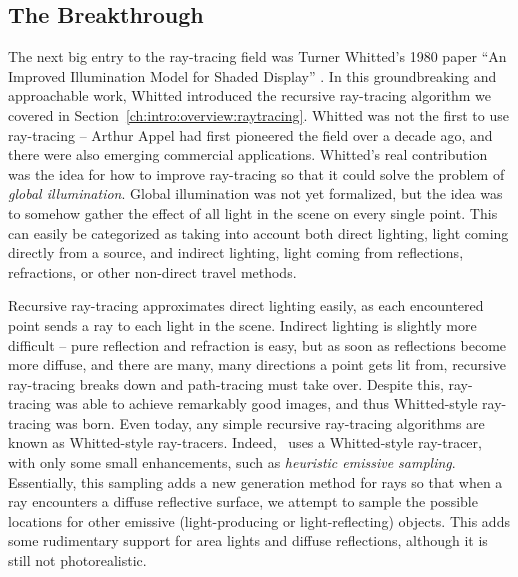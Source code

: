 \subsection{The Breakthrough}
\label{ch:relatedwork:discovery:breakthrough}

The next big entry to the ray-tracing field was Turner Whitted's 1980 paper ``An Improved Illumination Model for Shaded Display'' \cite{whitted1980improved}.
In this groundbreaking and approachable work, Whitted introduced the recursive ray-tracing algorithm we covered in Section~\ref{ch:intro:overview:raytracing}.
Whitted was not the first to use ray-tracing -- Arthur Appel had first pioneered the field over a decade ago, and there were also emerging commercial applications.
Whitted's real contribution was the idea for how to improve ray-tracing so that it could solve the problem of {\it global illumination}.
Global illumination was not yet formalized, but the idea was to somehow gather the effect of all light in the scene on every single point.
This can easily be categorized as taking into account both direct lighting, light coming directly from a source, and indirect lighting, light coming from reflections, refractions, or other non-direct travel methods.

Recursive ray-tracing approximates direct lighting easily, as each encountered point sends a ray to each light in the scene.
Indirect lighting is slightly more difficult -- pure reflection and refraction is easy, but as soon as reflections become more diffuse, and there are many, many directions a point gets lit from, recursive ray-tracing breaks down and path-tracing must take over.
Despite this, ray-tracing was able to achieve remarkably good images, and thus Whitted-style ray-tracing was born.
Even today, any simple recursive ray-tracing algorithms are known as Whitted-style ray-tracers. Indeed, \name\ uses a Whitted-style ray-tracer, with only some small enhancements, such as {\it heuristic emissive sampling}.
Essentially, this sampling adds a new generation method for rays so that when a ray encounters a diffuse reflective surface, we attempt to sample the possible locations for other emissive (light-producing or light-reflecting) objects.
This adds some rudimentary support for area lights and diffuse reflections, although it is still not photorealistic.

